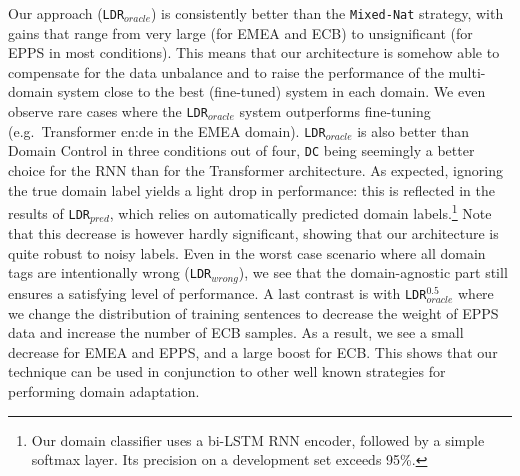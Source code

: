 Our approach (\texttt{LDR}$_{oracle}$) is consistently better than the \texttt{Mixed-Nat} strategy, with gains that range from very large (for EMEA and ECB) to unsignificant (for EPPS in most conditions). 
This means that our architecture is somehow able to compensate for the data unbalance and to raise the performance of the multi-domain system close to the best (fine-tuned) system in each domain. 
We even observe rare cases where the \texttt{LDR}$_{oracle}$ system outperforms fine-tuning (e.g.\ Transformer en:de in the EMEA domain). 
\texttt{LDR}$_{oracle}$ is also better than Domain Control in three conditions out of four, \texttt{DC} being seemingly a better choice for the RNN than for the Transformer architecture. 
As expected, ignoring the true domain label yields a light drop in performance: this is reflected in the results of \texttt{LDR}$_{pred}$, which relies on automatically predicted domain labels.\footnote{Our domain classifier uses a bi-LSTM RNN encoder, followed by a simple softmax layer. 
Its precision on a development set exceeds 95\%.}
Note that this decrease is however hardly significant, showing that our architecture is quite robust to noisy labels. 
Even in the worst case scenario where all domain tags are intentionally wrong (\texttt{LDR}$_{wrong}$), we see that the domain-agnostic part still ensures a satisfying level of performance. 
A last contrast is with \texttt{LDR}$_{oracle}^{0.5}$ where we change the distribution of training sentences to decrease the weight of EPPS data and increase the number of ECB samples. 
As a result, we see a small decrease for EMEA and EPPS, and a large boost for ECB. 
This shows that our technique can be used in conjunction to other well known strategies for performing domain adaptation. 

